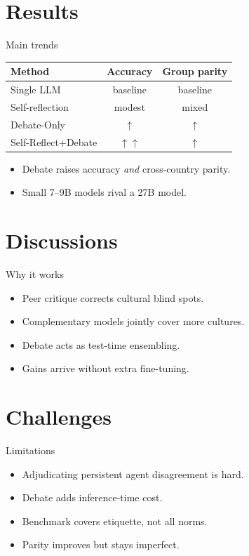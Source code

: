 \documentclass{beamer}
\begin{document}
\section{Results}
\begin{frame}{Main trends}
\begin{center}
\begin{tabular}{lcc}
\toprule
Method & Accuracy & Group parity \\
\midrule
Single LLM & baseline & baseline \\
Self-reflection & modest & mixed \\
Debate-Only & $\uparrow$ & $\uparrow$ \\
Self-Reflect+Debate & $\uparrow\uparrow$ & $\uparrow$ \\
\bottomrule
\end{tabular}
\end{center}
\begin{itemize}
\item Debate raises accuracy \emph{and} cross-country parity.
\item Small 7--9B models rival a 27B model.
\end{itemize}
\end{frame}

\section{Discussions}
\begin{frame}{Why it works}
\begin{itemize}
\item Peer critique corrects cultural blind spots.
\item Complementary models jointly cover more cultures.
\item Debate acts as test-time ensembling.
\item Gains arrive without extra fine-tuning.
\end{itemize}
\end{frame}

\section{Challenges}
\begin{frame}{Limitations}
\begin{itemize}
\item Adjudicating persistent agent disagreement is hard.
\item Debate adds inference-time cost.
\item Benchmark covers etiquette, not all norms.
\item Parity improves but stays imperfect.
\end{itemize}
\end{frame}
\end{document}
